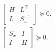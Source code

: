 \begin{framed}
	\begin{subequations} \nonumber
		\begin{gather}
			\begin{bmatrix}
				H & L^\top \\
				L & S_u^{-1}
			\end{bmatrix} \succeq 0,
			\\
			\begin{bmatrix}
				S_x & I \\
				I & H
			\end{bmatrix} \succeq 0.
		\end{gather}
	\end{subequations}


	\vspace{0.5em}
\end{framed}
